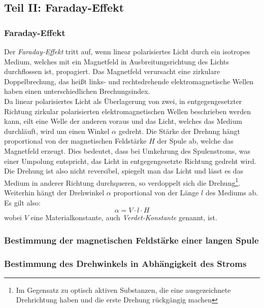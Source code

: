 \subsection{Teil II: Faraday-Effekt}
\subsubsection{Faraday-Effekt}
Der \emph{Faraday-Effekt} tritt auf, wenn linear polarisiertes Licht durch ein isotropes Medium, welches mit ein Magnetfeld in 
Ausbreitungsrichtung des Lichts durchflossen ist, propagiert. Das Magnetfeld verursacht eine zirkulare Doppelbrechung, das heißt links- und 
rechtsdrehende elektromagnetische Wellen haben einen unterschiedlichen Brechungsindex. \\
Da linear polarisiertes Licht als Überlagerung von zwei, in entgegengesetzter Richtung zirkular polarisierten elektromagnetischen Wellen 
beschrieben werden kann, eilt eine Welle der anderen voraus und das Licht, welches das Medium durchläuft, wird um einen Winkel $\alpha$ gedreht. 
Die Stärke der Drehung hängt proportional von der magnetischen Feldstärke $H$ der Spule ab, welche das Magnetfeld erzeugt. 
Dies bedeutet, dass bei Umkehrung des Spulenstroms, was einer Umpolung entspricht, das Licht in entgegengesetzte Richtung gedreht wird. 
Die Drehung ist also nicht reversibel, spiegelt man das Licht und lässt es das Medium in anderer Richtung durchqueren, 
so verdoppelt sich die Drehung\footnote{Im Gegensatz zu optisch aktiven Substanzen, die eine ausgezeichnete Drehrichtung haben 
und die erste Drehung rückgängig machen}. Weiterhin hängt der Drehwinkel $\alpha$ proportional von der Länge $l$ des Mediums ab.
Es gilt also:
\begin{equation}
\label{eq:faraday}
  \alpha = V \cdot l \cdot H
\end{equation}
wobei $V$ eine Materialkonstante, auch \emph{Verdet-Konstante} genannt, ist.

\subsubsection{Bestimmung der magnetischen Feldstärke einer langen Spule}

\subsubsection{Bestimmung des Drehwinkels in Abhängigkeit des Stroms}